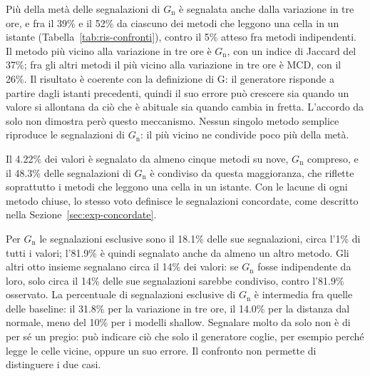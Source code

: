 Più della metà delle segnalazioni di $G_{\mathrm{n}}$ è segnalata anche dalla variazione in tre ore, e fra il 39\% e il 52\% da ciascuno dei metodi che leggono una cella in un istante (Tabella~\ref{tab:ris-confronti}), contro il 5\% atteso fra metodi indipendenti. Il metodo più vicino alla variazione in tre ore è $G_{\mathrm{n}}$, con un indice di Jaccard del 37\%; fra gli altri metodi il più vicino alla variazione in tre ore è MCD, con il 26\%. Il risultato è coerente con la definizione di G: il generatore risponde a partire dagli istanti precedenti, quindi il suo errore può crescere sia quando un valore si allontana da ciò che è abituale sia quando cambia in fretta. L'accordo da solo non dimostra però questo meccanismo. Nessun singolo metodo semplice riproduce le segnalazioni di $G_{\mathrm{n}}$: il più vicino ne condivide poco più della metà.

Il 4.22\% dei valori è segnalato da almeno cinque metodi su nove, $G_{\mathrm{n}}$ compreso, e il 48.3\% delle segnalazioni di $G_{\mathrm{n}}$ è condiviso da questa maggioranza, che riflette soprattutto i metodi che leggono una cella in un istante. Con le lacune di ogni metodo chiuse, lo stesso voto definisce le segnalazioni concordate, come descritto nella Sezione~\ref{sec:exp-concordate}.

Per $G_{\mathrm{n}}$ le segnalazioni esclusive sono il 18.1\% delle sue segnalazioni, circa l'1\% di tutti i valori; l'81.9\% è quindi segnalato anche da almeno un altro metodo. Gli altri otto insieme segnalano circa il 14\% dei valori: se $G_{\mathrm{n}}$ fosse indipendente da loro, solo circa il 14\% delle sue segnalazioni sarebbe condiviso, contro l'81.9\% osservato. La percentuale di segnalazioni esclusive di $G_{\mathrm{n}}$ è intermedia fra quelle delle baseline: il 31.8\% per la variazione in tre ore, il 14.0\% per la distanza dal normale, meno del 10\% per i modelli shallow. Segnalare molto da solo non è di per sé un pregio: può indicare ciò che solo il generatore coglie, per esempio perché legge le celle vicine, oppure un suo errore. Il confronto non permette di distinguere i due casi.

